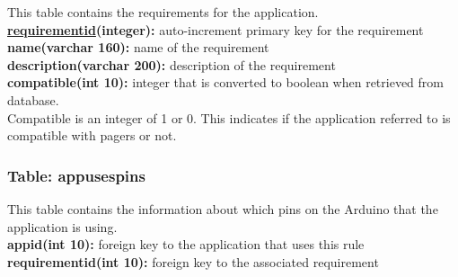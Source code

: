 			This table contains the requirements for the application.\\
			
			{\bf \underline{requirementid}(integer):} auto-increment primary key for the requirement \\
			\textbf{name(varchar 160):} name of the requirement \\
			\textbf{description(varchar 200):} description of the requirement \\
			\textbf{compatible(int 10):} integer that is converted to boolean when retrieved from database. \\

			Compatible is an integer of 1 or 0. This indicates if the application referred to is compatible with pagers or not.

		\subsubsection{Table: appusespins}

			This table contains the information about which pins on the Arduino that the application is using.\\
			
			\textbf{appid(int 10):} foreign key to the application that uses this rule \\
			\textbf{requirementid(int 10):} foreign key to the associated requirement \\

